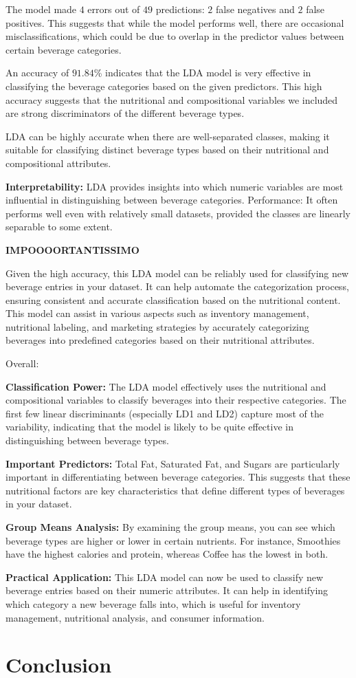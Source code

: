 \documentclass[
]{article}
\begin{document}
The model made \(4\) errors out of \(49\) predictions: \(2\) false
negatives and \(2\) false positives. This suggests that while the model
performs well, there are occasional misclassifications, which could be
due to overlap in the predictor values between certain beverage
categories.

An accuracy of \(91.84\)\% indicates that the LDA model is very
effective in classifying the beverage categories based on the given
predictors. This high accuracy suggests that the nutritional and
compositional variables we included are strong discriminators of the
different beverage types.

LDA can be highly accurate when there are well-separated classes, making
it suitable for classifying distinct beverage types based on their
nutritional and compositional attributes.

\textbf{Interpretability:} LDA provides insights into which numeric
variables are most influential in distinguishing between beverage
categories. Performance: It often performs well even with relatively
small datasets, provided the classes are linearly separable to some
extent.

\textbf{IMPOOOORTANTISSIMO}

Given the high accuracy, this LDA model can be reliably used for
classifying new beverage entries in your dataset. It can help automate
the categorization process, ensuring consistent and accurate
classification based on the nutritional content. This model can assist
in various aspects such as inventory management, nutritional labeling,
and marketing strategies by accurately categorizing beverages into
predefined categories based on their nutritional attributes.

Overall:

\textbf{Classification Power:} The LDA model effectively uses the
nutritional and compositional variables to classify beverages into their
respective categories. The first few linear discriminants (especially
LD1 and LD2) capture most of the variability, indicating that the model
is likely to be quite effective in distinguishing between beverage
types.

\textbf{Important Predictors:} Total Fat, Saturated Fat, and Sugars are
particularly important in differentiating between beverage categories.
This suggests that these nutritional factors are key characteristics
that define different types of beverages in your dataset.

\textbf{Group Means Analysis:} By examining the group means, you can see
which beverage types are higher or lower in certain nutrients. For
instance, Smoothies have the highest calories and protein, whereas
Coffee has the lowest in both.

\textbf{Practical Application:} This LDA model can now be used to
classify new beverage entries based on their numeric attributes. It can
help in identifying which category a new beverage falls into, which is
useful for inventory management, nutritional analysis, and consumer
information.

\section{Conclusion}\label{conclusion}
\end{document}
